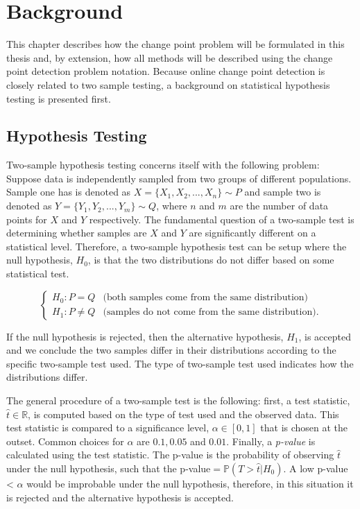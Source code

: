 \chapter{Background}
This chapter describes how the change point problem will be formulated in this thesis and, by extension, how all methods will be described using the change point detection problem notation. Because online change point detection is closely related to two sample testing, a background on statistical hypothesis testing is presented first. 

\section{Hypothesis Testing}

Two-sample hypothesis testing concerns itself with the following problem: Suppose data is independently sampled from two groups of different populations. Sample one has is denoted as  $X=\{X_1, X_2, ...,X_n\} \sim P$ and sample two is denoted as $Y=\{Y_1, Y_2, ...,Y_m\} \sim Q$, where $n$ and $m$ are the number of data points for $X$ and $Y$ respectively. The fundamental question of a two-sample test is determining whether samples are $X$ and $Y$ are significantly different on a statistical level. Therefore, a two-sample hypothesis test can be setup where the null hypothesis, $H_0$, is that the two distributions do not differ based on some statistical test. 

\begin{equation}
  \begin{cases}
    H_0: P = Q & \text{(both samples come from the same distribution)} \\
    H_1: P \neq Q & \text{(samples do not come from the same distribution)}. 
  \end{cases}
\end{equation}

If the null hypothesis is rejected, then the alternative hypothesis, $H_1$, is accepted and we conclude the two samples differ in their distributions according to the specific two-sample test used. The type of two-sample test used indicates how the distributions differ.  

The general procedure of a two-sample test is the following: first, a test statistic, $\hat{t} \in \mathbb{R}$, is computed based on the type of test used and the observed data. This test statistic is compared to a significance level, $\alpha \in [0,1]$ that is chosen  at the outset. Common choices for $\alpha$ are $0.1, 0.05$ and $0.01$. Finally, a \textit{p-value} is calculated using the test statistic. The p-value is the probability of observing $\hat{t}$ under the null hypothesis, such that the p-value$=\mathbb{P}(T>\hat{t}|H_0)$. A low p-value < $\alpha$ would be improbable under the null hypothesis, therefore, in this situation it is rejected and the alternative hypothesis is accepted.

